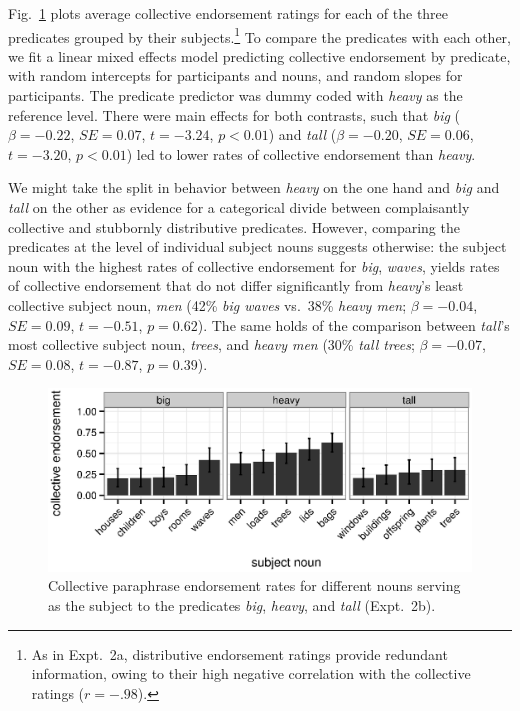 \documentclass[linguex]{sp}
\newcommand{\ndg}[1]{\textcolor{Green}{[ndg: #1]}}
\begin{document}

Fig.~\ref{bhtcoll} plots average collective endorsement ratings for each of the three predicates grouped by their subjects.\footnote{As in Expt.~2a, distributive endorsement ratings provide redundant information, owing to their high negative correlation with the collective ratings ($r=-.98$).}
%
%
To compare the predicates with each other, we fit a linear mixed effects model predicting collective endorsement by predicate, with random intercepts for participants and nouns, and random slopes for participants. The predicate predictor was dummy coded with \emph{heavy} as the reference level. There were main effects for both contrasts, such that \emph{big} ($\beta=-0.22$, $SE=0.07$, $t=-3.24$, $p<0.01$) and \emph{tall} ($\beta=-0.20$, $SE=0.06$, $t=-3.20$, $p<0.01$) led to lower rates of collective endorsement than \emph{heavy}. 

We might take the split in behavior between \emph{heavy} on the one hand and \emph{big} and \emph{tall} on the other as evidence for a categorical divide between complaisantly collective and stubbornly distributive predicates. However, comparing the predicates at the level of individual subject nouns suggests otherwise: the subject noun with the highest rates of collective endorsement for \emph{big}, \emph{waves}, yields rates of collective endorsement that do not differ significantly from \emph{heavy}'s least collective subject noun, \emph{men} (42\% \emph{big waves} vs.~38\% \emph{heavy men}; $\beta=-0.04$, $SE=0.09$, $t=-0.51$, $p=0.62$). The same holds of the comparison between \emph{tall}'s most collective subject noun, \emph{trees}, and \emph{heavy men} (30\% \emph{tall trees}; $\beta=-0.07$, $SE=0.08$, $t=-0.87$, $p=0.39$). 


\begin{figure}[htb]
	\centering
	\includegraphics[width=.85\linewidth]{plots/bht_plot.eps}
	\vspace{0pt}
	\caption{Collective paraphrase endorsement rates for different nouns serving as the subject to the predicates \emph{big}, \emph{heavy}, and \emph{tall} (Expt.~2b).} \label{bhtcoll}
\end{figure}
\end{document}
